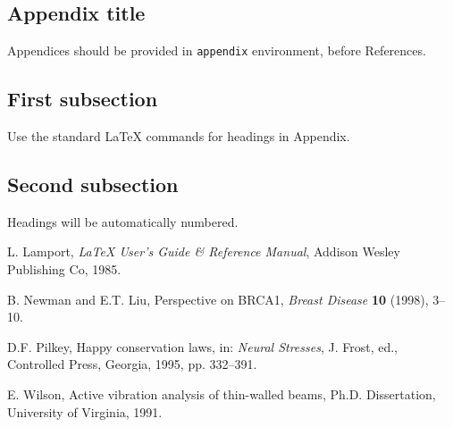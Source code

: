 \documentclass[ds]{iosart2x}
\begin{document}
\begin{appendix}
\section{Appendix title}
Appendices should be provided in \verb|appendix| environment, before References.

\subsection{First subsection}
Use the standard \LaTeX{} commands for headings in Appendix.

\subsection{Second subsection}
Headings will be automatically numbered. 
\end{appendix}


\begin{thebibliography}{0}

 L. Lamport, \textit{\LaTeX{} User's Guide \& Reference Manual},
 Addison Wesley Publishing Co, 1985.

 B. Newman and E.T. Liu, Perspective on BRCA1, \textit{Breast Disease} \textbf{10} (1998), 3--10. 

 D.F. Pilkey, Happy conservation laws, in: \textit{Neural Stresses}, J. Frost, ed., Controlled Press, Georgia, 1995, pp. 332--391.

 E. Wilson, Active vibration analysis of thin-walled beams, Ph.D. Dissertation, University of Virginia, 1991.

\end{thebibliography}
\end{document}
